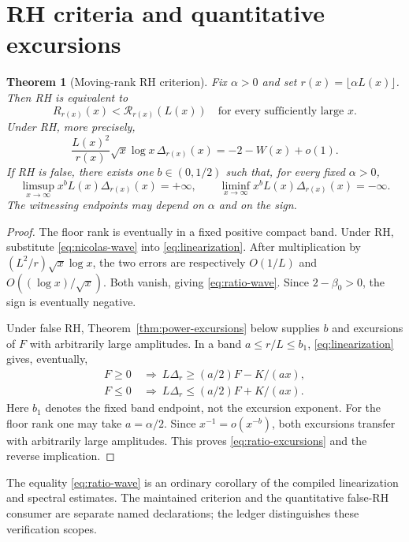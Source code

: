 \documentclass[11pt]{article}
\newtheorem{theorem}{Theorem}[section]
\theoremstyle{definition}
\begin{document}
\section{RH criteria and quantitative excursions}\label{sec:rh}
\begin{theorem}[Moving-rank RH criterion]\label{thm:rh-ratio}
Fix $\alpha>0$ and set $r(x)=\lfloor\alpha L(x)\rfloor$.
Then RH is equivalent to
\[
 R_{r(x)}(x)<\mathcal R_{r(x)}(L(x))
 \quad\text{for every sufficiently large }x.
\]
Under RH, more precisely,
\begin{equation}\label{eq:ratio-wave}
 \frac{L(x)^2}{r(x)}\sqrt{x}\log x\,\Delta_{r(x)}(x)
       =-2-W(x)+o(1).
\end{equation}
If RH is false, there exists one $b\in(0,1/2)$ such that, for every
fixed $\alpha>0$,
\begin{equation}\label{eq:ratio-excursions}
 \limsup_{x\to\infty}x^bL(x)\Delta_{r(x)}(x)=+\infty,\qquad
 \liminf_{x\to\infty}x^bL(x)\Delta_{r(x)}(x)=-\infty.
\end{equation}
The witnessing endpoints may depend on $\alpha$ and on the sign.
\end{theorem}
\begin{proof}
The floor rank is eventually in a fixed positive compact band.
Under RH, substitute \eqref{eq:nicolas-wave} into
\eqref{eq:linearization}. After multiplication by
$(L^2/r)\sqrt{x}\log x$, the two errors are respectively
$O(1/L)$ and $O((\log x)/\sqrt{x})$. Both vanish, giving
\eqref{eq:ratio-wave}. Since $2-\beta_0>0$, the sign is eventually
negative.

Under false RH, Theorem~\ref{thm:power-excursions} below supplies $b$
and excursions of $F$ with arbitrarily large amplitudes.
In a band $a\le r/L\le b_1$, \eqref{eq:linearization} gives, eventually,
\[
\begin{aligned}
 F\ge0&\ \Longrightarrow\ L\Delta_r\ge(a/2)F-K/(ax),\\
 F\le0&\ \Longrightarrow\ L\Delta_r\le(a/2)F+K/(ax).
\end{aligned}
\]
Here $b_1$ denotes the fixed band endpoint, not the excursion exponent.
For the floor rank one may take $a=\alpha/2$.
Since $x^{-1}=o(x^{-b})$, both excursions transfer with arbitrarily
large amplitudes. This proves \eqref{eq:ratio-excursions} and the
reverse implication.
\end{proof}

The equality \eqref{eq:ratio-wave} is an ordinary corollary of the
compiled linearization and spectral estimates. The maintained
criterion and the quantitative false-RH consumer are separate named
declarations; the ledger distinguishes these verification scopes.
\end{document}
